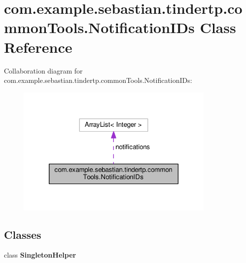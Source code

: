 \hypertarget{classcom_1_1example_1_1sebastian_1_1tindertp_1_1commonTools_1_1NotificationIDs}{}\section{com.\+example.\+sebastian.\+tindertp.\+common\+Tools.\+Notification\+I\+Ds Class Reference}
\label{classcom_1_1example_1_1sebastian_1_1tindertp_1_1commonTools_1_1NotificationIDs}


Collaboration diagram for com.\+example.\+sebastian.\+tindertp.\+common\+Tools.\+Notification\+I\+Ds\+:\nopagebreak
\begin{figure}[H]
\begin{center}
\leavevmode
\includegraphics[width=274pt]{classcom_1_1example_1_1sebastian_1_1tindertp_1_1commonTools_1_1NotificationIDs__coll__graph}
\end{center}
\end{figure}
\subsection*{Classes}
\begin{DoxyCompactItemize}
\item 
class {\bfseries Singleton\+Helper}
\end{DoxyCompactItemize}
